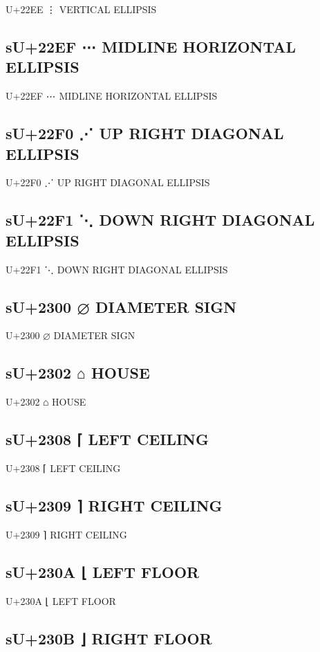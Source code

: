 U+22EE ⋮ VERTICAL ELLIPSIS

\subsection{sU+22EF ⋯ MIDLINE HORIZONTAL ELLIPSIS}

U+22EF ⋯ MIDLINE HORIZONTAL ELLIPSIS

\subsection{sU+22F0 ⋰ UP RIGHT DIAGONAL ELLIPSIS}

U+22F0 ⋰ UP RIGHT DIAGONAL ELLIPSIS

\subsection{sU+22F1 ⋱ DOWN RIGHT DIAGONAL ELLIPSIS}

U+22F1 ⋱ DOWN RIGHT DIAGONAL ELLIPSIS

\subsection{sU+2300 ⌀ DIAMETER SIGN}

U+2300 ⌀ DIAMETER SIGN

\subsection{sU+2302 ⌂ HOUSE}

U+2302 ⌂ HOUSE

\subsection{sU+2308 ⌈ LEFT CEILING}

U+2308 ⌈ LEFT CEILING

\subsection{sU+2309 ⌉ RIGHT CEILING}

U+2309 ⌉ RIGHT CEILING

\subsection{sU+230A ⌊ LEFT FLOOR}

U+230A ⌊ LEFT FLOOR

\subsection{sU+230B ⌋ RIGHT FLOOR}

